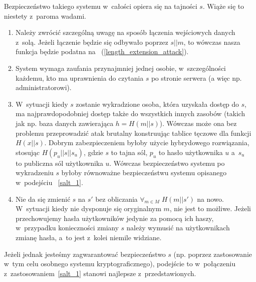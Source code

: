 Bezpieczeństwo takiego systemu w~całości opiera się na tajności $s$. Wiąże się
to niestety z~paroma wadami.
\begin{enumerate}

\item Należy zwrócić szczególną uwagę na sposób łączenia wejściowych danych
z~solą. Jeżeli łączenie będzie się odbywało poprzez $s||m$, to wówczas nasza
funkcja będzie podatna na ~(\ref{length_extension_attack}).

\item System wymaga zaufania przynajmniej jednej osobie, w~szczególności
każdemu, kto ma uprawnienia do czytania $s$ po stronie serwera (a więc np.
administratorowi).

\item W~sytuacji kiedy $s$ zostanie wykradzione osoba, która uzyskała dostęp do
$s$, ma najprawdopodobniej dostęp także do wszystkich innych zasobów (takich
jak np. baza danych zawierająca $h=H(m||s)$). Wówczas może ona bez problemu
przeprowadzić atak brutalny konstruując tablice tęczowe dla funkcji $H(x||s)$.
Dobrym zabezpieczeniem byłoby użycie hybrydowego rozwiązania, stosując
$H(p_u||s||s_u)$, gdzie $s$ to tajna sól, $p_u$ to hasło użytkownika $u$
a~$s_u$ to publiczna sól użytkownika $u$. Wówczas bezpieczeństwo systemu po
wykradzeniu $s$ byłoby równoważne bezpieczeństwu systemu opisanego w~podejściu
~\ref{salt_1}.

\item Nie da się zmienić $s$ na $s'$ bez obliczania $\forall_{m \in M} \;
H(m||s')$ na nowo. W~sytuacji kiedy nie dysponuje się oryginalnym $m$, nie jest
to możliwe. Jeżeli przechowujemy hasła użytkowników jedynie za pomocą ich
haszy, w~przypadku konieczności zmiany $s$ należy wymusić na użytkownikach
zmianę hasła, a~to jest z~kolei niemile widziane.

\end{enumerate}
Jeżeli jednak jesteśmy zagwarantować bezpieczeństwo $s$ (np. poprzez
zastosowanie w~tym celu osobnego systemu kryptograficznego), podejście to
w~połączeniu z~zastosowaniem~\ref{salt_1} stanowi najlepsze z~przedstawionych. 
